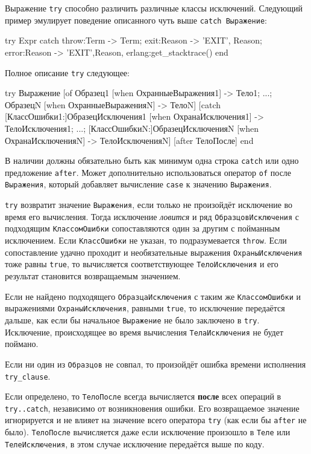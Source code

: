 Выражение \texttt{try} способно различить различные классы исключений.  
Следующий пример эмулирует поведение описанного чуть выше \texttt{catch
Выражение}:

\begin{erlang}
try Expr
catch
    throw:Term -> Term;
    exit:Reason -> {'EXIT', Reason};
    error:Reason -> {'EXIT',{Reason, erlang:get_stacktrace()}}
end
\end{erlang}

Полное описание \texttt{try} следующее:

\begin{erlangru}
try Выражение [of
    Образец1 [when ОхранныеВыражения1] -> Тело1;
    ...;
    ОбразецN [when ОхранныеВыраженияN] -> ТелоN]
[catch
    [КлассОшибки1:]ОбразецИсключения1 [when ОхранаИсключения1] ->
        ТелоИсключения1;
    ...;
    [КлассОшибкиN:]ОбразецИсключенияN [when ОхранаИсключенияN] ->
        ТелоИсключенияN]
[after ТелоПосле]
end
\end{erlangru}

В наличии должны обязательно быть как минимум одна строка \texttt{catch} или 
одно предложение \texttt{after}.  Может дополнительно использоваться оператор
\texttt{of} после \texttt{Выражения}, который добавляет вычисление \texttt{case}
к значению \texttt{Выражения}.

\texttt{try} возвратит значение \texttt{Выражения}, если только не произойдёт 
исключение во время его вычисления.  Тогда исключение \emph{ловится} и ряд 
\texttt{ОбразцовИсключения} с подходящим \texttt{КлассомОшибки} сопоставляются
один за другим с пойманным исключением.  Если \texttt{КлассОшибки} не указан, то
подразумевается \texttt{throw}. Если сопоставление удачно проходит и 
необязательные выражения \texttt{ОхраныИсключения} тоже равны \texttt{true}, то
вычисляется соответствующее \texttt{ТелоИсключения} и его результат становится
возвращаемым значением.

Если не найдено подходящего \texttt{ОбразцаИсключения} с таким же 
\texttt{КлассомОшибки} и выражениями \texttt{ОхраныИсключения}, равными 
\texttt{true}, то исключение передаётся дальше, как если бы начальное 
\texttt{Выражение} не было заключено в \texttt{try}.  Исключение, происходящее
во время вычисления \texttt{ТелаИсключения} не будет поймано.

Если ни один из \texttt{Образцов} не совпал, то произойдёт ошибка времени 
исполнения \texttt{try\_clause}.

Если определено, то \texttt{ТелоПосле} всегда вычисляется \textbf{после} всех 
операций в\linebreak
\texttt{try..catch}, независимо от возникновения ошибки. Его 
возвращаемое значение игнорируется и не влияет на значение всего оператора 
\texttt{try} (как если бы \texttt{after} не было). \texttt{ТелоПосле} 
вычисляется даже если исключение произошло в \texttt{Теле} или 
\texttt{ТелеИсключения}, в этом случае исключение передаётся выше по коду.

